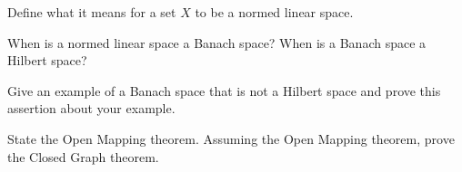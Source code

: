 \begin{alist}
\item Define what it means for a set $X$ to be a normed linear space.
\item When is a normed linear space a Banach space? When is a Banach
space a Hilbert space?
\item Give an example of a Banach space that is not a Hilbert space
and prove this assertion about your example.
\item State the Open Mapping theorem. Assuming the Open Mapping theorem,
prove the Closed Graph theorem.
\end{alist}
